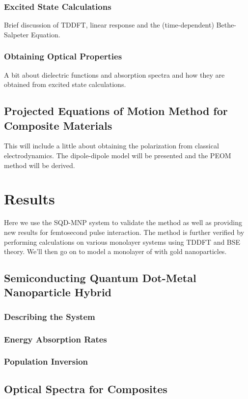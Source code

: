\documentclass[11pt]{report}
\begin{document}
\subsection{Excited State Calculations}
Brief discussion of TDDFT, linear response and the (time-dependent)
Bethe-Salpeter Equation.
\subsection{Obtaining Optical Properties}
A bit about dielectric functions and absorption spectra and how they are
obtained from excited state calculations.
\section{Projected Equations of Motion Method for Composite Materials}
This will include a little about obtaining the polarization from classical
electrodynamics. The dipole-dipole model will be presented and the PEOM method
will be derived.
%
%

\clearpage
\chapter{Results}

Here we use the SQD-MNP system to validate the method as well as providing new
results for femtosecond pulse interaction. The method is further verified by
performing calculations on various monolayer systems using TDDFT and BSE
theory. We'll then go on to model a monolayer of \mos with gold nanoparticles.

\section{Semiconducting Quantum Dot-Metal Nanoparticle Hybrid}
\subsection{Describing the System}
\subsection{Energy Absorption Rates}
\subsection{Population Inversion}
\section{Optical Spectra for \mos Composites}
\end{document}
